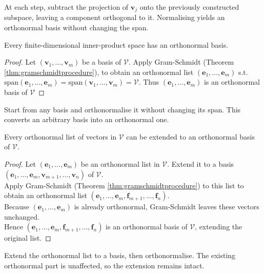 At each step, subtract the projection of $\mathbf{v}_j$ onto the previously constructed subspace, leaving a component orthogonal to it. Normalising yields an orthonormal basis without changing the span.

\begin{corollary} Every finite-dimensional inner-product space has an orthonormal basis.
\begin{proof} Let $(\mathbf{v}_1, \ldots, \mathbf{v}_m)$ be a basis of $\mathcal{V}$. Apply Gram-Schmidt (Theorem \ref{thm:gramschmidtprocedure}), to obtain an orthonormal list $(\mathbf{e}_1, \ldots, \mathbf{e}_m)$ s.t. $\text{span}(\mathbf{e}_1, \ldots, \mathbf{e}_m) = \text{span}(\mathbf{v}_1, \ldots, \mathbf{v}_m) = \mathcal{V}$. Thus $(\mathbf{e}_1, \ldots, \mathbf{e}_m)$ is an orthonormal basis of $\mathcal{V}$
\end{proof}
\end{corollary}

Start from any basis and orthonormalise it without changing its span. This converts an arbitrary basis into an orthonormal one.

\begin{corollary} \label{cor:linindepextendorthonorm} Every orthonormal list of vectors in $\mathcal{V}$ can be extended to an orthonormal basis of $\mathcal{V}$.
\begin{proof} Let $(\mathbf{e}_1, \ldots, \mathbf{e}_m)$ be an orthonormal list in $\mathcal{V}
$. Extend it to a basis $(\mathbf{e}_1, \ldots, \mathbf{e}_m, \mathbf{v}_{m+1}, \ldots, \mathbf{v}_n)$ of $\mathcal{V}$.\\
Apply Gram-Schmidt (Theorem \ref{thm:gramschmidtprocedure}) to this list to obtain an orthonormal list $(\mathbf{e}_1, \ldots, \mathbf{e}_m, \mathbf{f}_{m+1}, \ldots, \mathbf{f}_n)$.\\
Because $(\mathbf{e}_1, \ldots, \mathbf{e}_m)$ is already orthonormal, Gram-Schmidt leaves these vectors unchanged.\\
Hence $(\mathbf{e}_1, \ldots, \mathbf{e}_m, \mathbf{f}_{m+1}, \ldots, \mathbf{f}_n)$ is an orthonormal basis of $\mathcal{V}$, extending the original list.
\end{proof}
\end{corollary}

Extend the orthonormal list to a basis, then orthonormalise. The existing orthonormal part is unaffected, so the extension remains intact.

